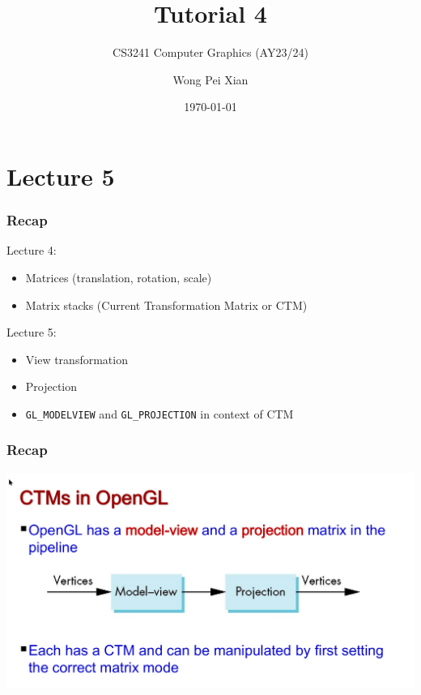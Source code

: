 \documentclass{beamer}
\title{Tutorial 4}
\subtitle{CS3241 Computer Graphics (AY23/24)}
\date{\today}
\author{Wong Pei Xian}
\institute[]{\email{e0389023@u.nus.edu}}
\begin{document}
\frame[plain]{\titlepage}

\section{Lecture 5}

\begin{frame}
    \frametitle{Recap}

    Lecture 4:
    \begin{itemize}
        \item Matrices (translation, rotation, scale)
        \item Matrix stacks (Current Transformation Matrix or CTM)
    \end{itemize}

    \vspace{1em}

    Lecture 5:
    \begin{itemize}
        \item View transformation
        \item Projection
        \item \texttt{GL\_MODELVIEW} and \texttt{GL\_PROJECTION} in context of CTM
    \end{itemize}

\end{frame}

\begin{frame}
    \frametitle{Recap}

    \centering
    \includegraphics[scale=0.3]{ctm_opengl.png}

\end{frame}
\end{document}
